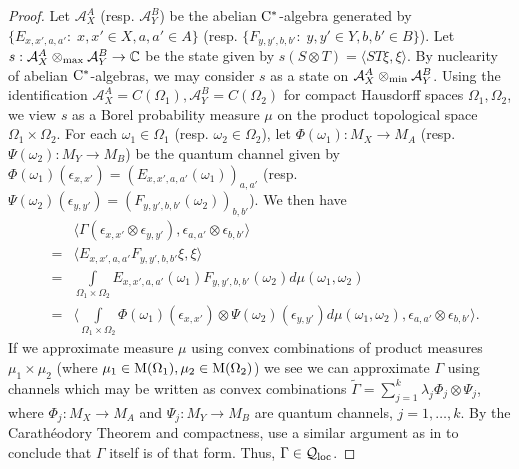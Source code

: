 \documentclass[11pt]{amsart}
\newcommand{\cl}[1]{\mathcal{#1}}
\newcommand{\bb}[1]{\mathbb{#1}}
\begin{document}
\begin{proof}
Let $\cl{A}_{X}^{A}$ (resp. $\cl{A}_{Y}^{B}$) be the abelian ${\rm C}^{*}$-algebra generated by $\{E_{x, x', a, a'}: \; x, x' \in X, a, a' \in A\}$ (resp. $\{F_{y, y', b, b'}: \; y, y' \in Y, b, b' \in B\}$). Let $s: \cl{A}_{X}^{A}\otimes_{\rm max} \cl{A}_{Y}^{B} \rightarrow \bb{C}$ be the state given by $s(S\otimes T) = \langle ST\xi, \xi\rangle$. By nuclearity of abelian ${\rm C}^{*}$-algebras, we may consider $s$ as a state on $\cl{A}_{X}^{A}\otimes_{\rm min}\cl{A}_{Y}^{B}$. Using the identification $\cl{A}_{X}^{A} = C(\Omega_{1}), \cl{A}_{Y}^{B} = C(\Omega_{2})$ for compact Hausdorff spaces $\Omega_{1}, \Omega_{2}$, we view $s$ as a Borel probability measure $\mu$ on the product topological space $\Omega_{1}\times \Omega_{2}$. For each $\omega_{1} \in \Omega_{1}$ (resp. $\omega_{2} \in \Omega_{2}$), let $\Phi(\omega_{1}): M_{X}\rightarrow M_{A}$ (resp. $\Psi(\omega_{2}): M_{Y}\rightarrow M_{B}$) be the quantum channel given by $\Phi(\omega_{1})(\epsilon_{x, x'}) = (E_{x, x', a, a'}(\omega_{1}))_{a, a'}$ (resp. $\Psi(\omega_{2})(\epsilon_{y, y'}) = (F_{y, y', b, b'}(\omega_{2}))_{b, b'}$). We then have
\begin{eqnarray*}
& &
	\langle\Gamma(\epsilon_{x, x'}\otimes \epsilon_{y, y'}), \epsilon_{a,a'}\otimes \epsilon_{b,b'}\rangle \\
& = &
\langle E_{x, x', a, a'}F_{y, y', b, b'}\xi, \xi\rangle \\
& = &
\int\limits_{\Omega_{1}\times \Omega_{2}}E_{x, x', a, a'}(\omega_{1})F_{y, y', b, b'}(\omega_{2})d\mu(\omega_{1}, \omega_{2}) \\
& = &
\bigg\langle\int\limits_{\Omega_{1}\times \Omega_{2}}\Phi(\omega_{1})(\epsilon_{x, x'})\otimes \Psi(\omega_{2})(\epsilon_{y, y'})d\mu(\omega_{1}, \omega_{2}), \epsilon_{a,a'}\otimes \epsilon_{b, b'}\bigg\rangle.
\end{eqnarray*}
\noindent If we approximate measure $\mu$ using convex combinations of product measures $\mu_{1}\times \mu_{2}$ (where $\mu_{1} \in {\rm M}(\Omega_{1}), \mu_{2} \in {\rm M}(\Omega_{2})$) we see we can approximate $\Gamma$ using channels which may be written as convex combinations $\tilde{\Gamma} = \sum_{j=1}^{k}\lambda_{j}\Phi_{j}\otimes \Psi_{j}$, where $\Phi_{j}: M_{X}\rightarrow M_{A}$ and $\Psi_{j}: M_{Y}\rightarrow M_{B}$ are quantum channels, $j = 1, \hdots, k$. By the Carathéodory Theorem and compactness, use a similar argument as in \cite[Remark 4.10]{tt} to conclude that $\Gamma$ itself is of that form. Thus, $\Gamma \in \cl{Q}_{\rm loc}$. 
\end{proof}
\end{document}
